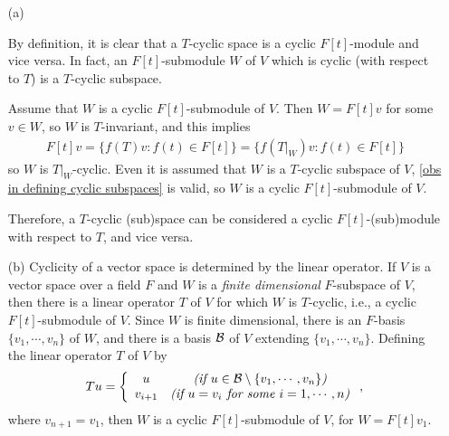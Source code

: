\begin{obs}
    \begin{enumerate}
        \item[(a)]
        {
            By definition, it is clear that a $T$-cyclic space is a cyclic $F[t]$-module and vice versa.
            In fact, an $F[t]$-submodule $W$ of $V$ which is cyclic (with respect to $T$) is a $T$-cyclic subspace.
        
            Assume that $W$ is a cyclic $F[t]$-submodule of $V$.
            Then $W=F[t]v$ for some $v\in W$, so $W$ is $T$-invariant, and this implies
            \begin{align}\label{obs in defining cyclic subspaces}
                F[t]v=\{f(T)v: f(t)\in F[t]\}=\{f(T|_W)v: f(t)\in F[t]\}
            \end{align}
            so $W$ is $T|_W$-cyclic.
            Even it is assumed that $W$ is a $T$-cyclic subspace of $V$, \cref{obs in defining cyclic subspaces} is valid, so $W$ is a cyclic $F[t]$-submodule of $V$.
        
            Therefore, a $T$-cyclic (sub)space can be considered a cyclic $F[t]$-(sub)module with respect to $T$, and vice versa.        
        }
        \item[(b)]
        {
            Cyclicity of a vector space is determined by the linear operator.
            If $V$ is a vector space over a field $F$ and $W$ is a \textit{finite dimensional} $F$-subspace of $V$, then there is a linear operator $T$ of $V$ for which $W$ is $T$-cyclic, i.e., a cyclic $F[t]$-submodule of $V$.
            Since $W$ is finite dimensional, there is an $F$-basis $\{v_1, \cdots, v_n\}$ of $W$, and there is a basis ${\mathcal{B}}$ of $V$ extending $\{v_1, \cdots, v_n\}$.
            Defining the linear operator $T$ of $V$ by
            \begin{align*}
                Tu=\left\{\begin{array}{cc}
                        u   &   \textit{(if $u\in{\mathcal{B}}\setminus\{v_1, \cdots, v_n\}$)}\\
                    v_{i+1} &   \textit{(if $u=v_i$ for some $i=1, \cdots, n$)}
                \end{array}\right.,
            \end{align*}
            where $v_{n+1}=v_1$, then $W$ is a cyclic $F[t]$-submodule of $V$, for $W=F[t]v_1$.
        }
    \end{enumerate}
\end{obs}

